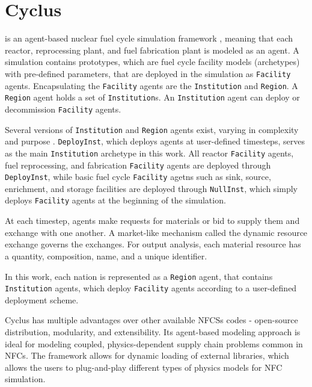 \section{Cyclus}

\Cyclus is an agent-based nuclear fuel cycle simulation framework 
\cite{huff_fundamental_2016}, meaning
that each reactor, reprocessing plant, and fuel fabrication plant is modeled as an agent.
A \Cyclus simulation contains prototypes, which are fuel cycle facility models (archetypes) with
pre-defined parameters, that are deployed in the simulation as \texttt{Facility} agents.
Encapsulating the \texttt{Facility} agents are the \texttt{Institution} and \texttt{Region}.
A \texttt{Region} agent holds a set of \texttt{Institution}s. 
An \texttt{Institution} agent can deploy or decommission \texttt{Facility} agents.

Several versions of \texttt{Institution}
and \texttt{Region} agents exist, varying in complexity and purpose \cite{huff_extensions_2014}.
\texttt{DeployInst}, which deploys agents at user-defined timesteps, serves
as the main \texttt{Institution} archetype in this work. All reactor \texttt{Facility} agents,
fuel reprocessing, and fabrication \texttt{Facility} agents
are deployed through \texttt{DeployInst}, while basic fuel cycle \texttt{Facility} agetns
such as sink, source, enrichment, and storage facilities are deployed 
through \texttt{NullInst}, which simply deploys \texttt{Facility}
agents at the beginning of the simulation.

At each timestep,
agents make requests for materials or bid to supply them and exchange
with one another. A market-like mechanism called the dynamic resource exchange
\cite{gidden_agent-based_2015} governs the exchanges.
For output analysis, each material resource has a quantity, composition, name, and a unique identifier.

In this work, each nation is represented as a \texttt{Region} agent,
that contains \texttt{Institution} agents, which deploy \texttt{Facility} 
agents according to a user-defined deployment scheme.

Cyclus has multiple advantages over other available
\glspl{NFCS} codes - open-source distribution, modularity,
and extensibility. Its agent-based modeling approach
is ideal for modeling coupled, physics-dependent
supply chain problems common in \glspl{NFC}.
The framework allows for dynamic loading of 
external libraries, which allows the users to plug-and-play
different types of physics models for \gls{NFC}
simulation.

